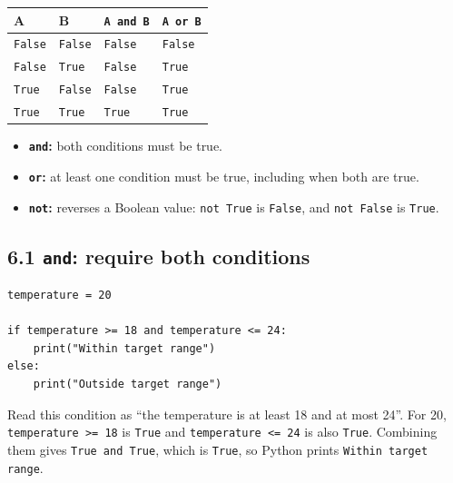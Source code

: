 \documentclass[12pt,a4paper]{article}
\begin{document}
\begingroup\small\renewcommand{\arraystretch}{1.3}\begin{longtable}{>{\raggedright\arraybackslash}p{}>{\raggedright\arraybackslash}p{}>{\raggedright\arraybackslash}p{}>{\raggedright\arraybackslash}p{}}
\toprule
\rowcolor{panel} A & B & \texttt{A and B} & \texttt{A or B} \\ \midrule\endhead
\texttt{False} & \texttt{False} & \texttt{False} & \texttt{False} \\
\texttt{False} & \texttt{True} & \texttt{False} & \texttt{True} \\
\texttt{True} & \texttt{False} & \texttt{False} & \texttt{True} \\
\texttt{True} & \texttt{True} & \texttt{True} & \texttt{True} \\
\bottomrule\end{longtable}\endgroup
\begin{itemize}
\item \textbf{\texttt{and}:} both conditions must be true.
\item \textbf{\texttt{or}:} at least one condition must be true, including when both are true.
\item \textbf{\texttt{not}:} reverses a Boolean value: \texttt{not True} is \texttt{False}, and \texttt{not False} is \texttt{True}.
\end{itemize}
\subsection*{6.1 \texttt{and}: require both conditions}
\begin{minipage}{\linewidth}
\begin{lstlisting}
temperature = 20

if temperature >= 18 and temperature <= 24:
    print("Within target range")
else:
    print("Outside target range")
\end{lstlisting}
\end{minipage}
\par
Read this condition as “the temperature is at least 18 and at most 24”. For 20, \texttt{temperature >= 18} is \texttt{True} and \texttt{temperature <= 24} is also \texttt{True}. Combining them gives \texttt{True and True}, which is \texttt{True}, so Python prints \texttt{Within target range}.
\end{document}
